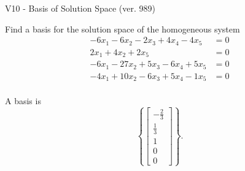 \begin{exercise}
  \begin{exerciseTitle}V10 - Basis of Solution Space (ver. 989)\end{exerciseTitle}
  \begin{exerciseStatement}
    Find a basis for the solution space of the homogeneous system 
\begin{align*}
 -6 x_ 1 -6 x_ 2 -2 x_ 3 + 4 x_ 4 -4 x_ 5 &= 0  \\ 
  2 x_ 1 + 4 x_ 2 + 2 x_ 5 &= 0  \\ 
  -6 x_ 1 -27 x_ 2 + 5 x_ 3 -6 x_ 4 + 5 x_ 5 &= 0  \\ 
  -4 x_ 1 + 10 x_ 2 -6 x_ 3 + 5 x_ 4 -1 x_ 5 &= 0  \\ 
 \end{align*}


 
  \end{exerciseStatement}

  \begin{exerciseAnswer}
   A basis is   
\[\left\{\left[\begin{array}{c}
-\frac{2}{3} \\
\frac{1}{3} \\
1 \\
0 \\
0
\end{array}\right]\right\}.\]

  


  \end{exerciseAnswer}
\end{exercise}
